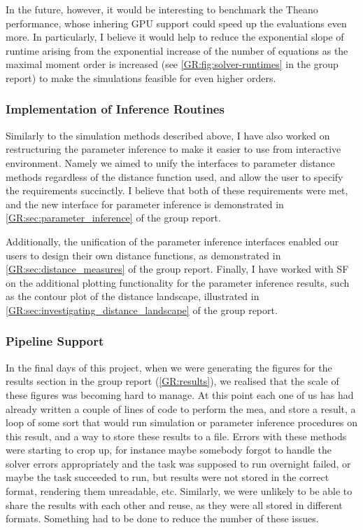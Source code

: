 In the future, however, it would be interesting to benchmark the Theano performance, whose inhering GPU support could speed up the evaluations even more.
In particularly, I believe it would help to reduce the exponential slope of runtime arising from the exponential increase of the number of equations as the maximal moment order is increased (see \autoref{GR:fig:solver-runtimes} in the group report) to make the simulations feasible for even higher orders. 

\subsubsection{Implementation of Inference Routines}

Similarly to the simulation methods described above, I have also worked on restructuring the parameter inference to make it easier to use from interactive environment. 
Namely we aimed to unify the interfaces to parameter distance methods regardless of the distance function used, and allow the user to specify the requirements succinctly.
I believe that both of these requirements were met, and the new interface for parameter inference is demonstrated in \autoref*{GR:sec:parameter_inference} of the group report.

Additionally, the unification of the parameter inference interfaces enabled our users to design their own distance functions, as demonstrated in \autoref*{GR:sec:distance_measures} of the group report.
Finally, I have worked with SF on the additional plotting functionality for the parameter inference results, such as the contour plot of the distance landscape, illustrated in 
\autoref*{GR:sec:investigating_distance_landscape} of the group report.

\subsubsection{Pipeline Support}

In the final days of this project, when we were generating the figures for the results section in the group report (\autoref{GR:results}), we realised that the scale of these figures was becoming hard to manage. 
At this point each one of us has had already written a couple of lines of code to perform the \acrlong{mea}, and store a result, a loop of some sort that would run simulation or parameter inference procedures on this result, and a way to store these results to a file. 
Errors with these methods were starting to crop up, for instance maybe somebody forgot to handle the solver errors appropriately and the task was supposed to run overnight failed, or maybe the task succeeded to run, but results were not stored in the correct format, rendering them unreadable, etc.
Similarly, we were unlikely to be able to share the results with each other and reuse, as they were all stored in different formats.
Something had to be done to reduce the number of these issues.

